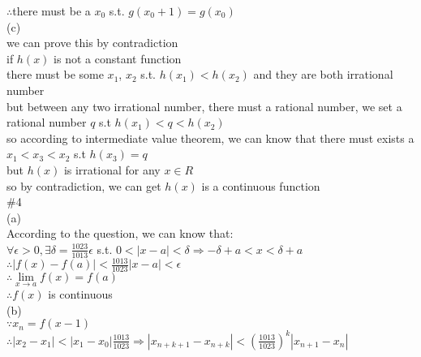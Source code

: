 \documentclass{article}
\begin{document}
$\therefore$\qquad there must be a $x_0$ s.t. $g(x_0+1)=g(x_0)$\\

(c)\\

we can prove this by contradiction\\

if $h(x)$ is not a constant function\\

there must be some $x_1$, $x_2$ s.t. $h(x_1)<h(x_2)$ and they are both irrational number\\

but between any two irrational number, there must a rational number, we set a rational number $q$ s.t $h(x_1)<q<h(x_2)$\\

so according to intermediate value theorem, we can know that there must exists a $x_1<x_3<x_2$ s.t $h(x_3)=q$\\

but $h(x)$ is irrational for any $x\in R$\\

so by contradiction, we can get $h(x)$ is a continuous function\\

\textcolor[rgb]{0.00,0.00,0.50}{\#4}\\

(a)\\

According to the question, we can know that:\\

$\forall\epsilon>0, \exists\delta=\displaystyle\frac{1023}{1013}\epsilon$ s.t. $0<|x-a|<\delta\Rightarrow-\delta+a<x<\delta+a$\\

$\therefore$\qquad$|f(x)-f(a)|<\displaystyle\frac{1013}{1023}|x-a|<\epsilon$\\

$\therefore$\qquad$\lim \limits_{x \to a}f(x)=f(a)$\\

$\therefore$\qquad$f(x)$ is continuous\\

(b)\\

$\because$\qquad$x_n=f(x-1)$\\

$\therefore$\qquad$|x_2-x_1|<|x_1-x_0|\displaystyle\frac{1013}{1023}\Rightarrow|x_{n+k+1}-x_{n+k}|<\left(\frac{1013}{1023}\right)^k|x_{n+1}-x_n|$\\
\end{document}
